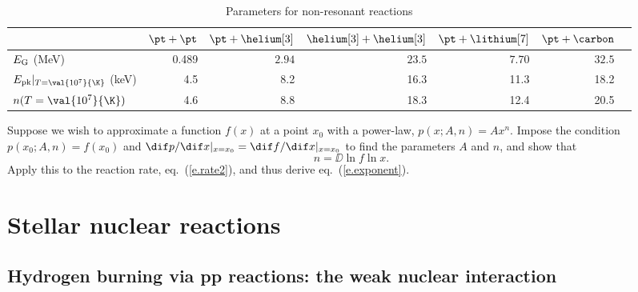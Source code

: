 \begin{table}[hb]
\caption{\label{t.reaction} Parameters for non-resonant reactions}
\begin{tabular}{lrrrrrr}
 & $\pt+\pt$ & $\pt+\helium[3]$ & $\helium[3]+\helium[3]$ & $\pt+\lithium[7]$ & $\pt+\carbon$\\
\hline
$E_{\mathrm{G}}$ (MeV) & 0.489 & $2.94$ & $23.5$ & $7.70$ & $32.5$\\
$\Epk|_{T=\val{10^{7}}{\K}}$ (keV) & 4.5 & 8.2 & 16.3 & 11.3 & 18.2\\
$n(T = \val{10^{7}}{\K})$ & 4.6 & 8.8 & 18.3 & 12.4 & 20.5\\
\end{tabular}
\end{table}

\begin{exercisebox}
\label{ex.power-law}
Suppose we wish to approximate a function $f(x)$ at a point $x_{0}$ with a power-law, $p(x;A,n) = Ax^{n}$. Impose the condition $p(x_{0};A,n) = f(x_{0})$ and $\dif p/\dif x |_{x=x_{0}} = \dif f/\dif x|_{x=x_{0}}$ to find the parameters $A$ and $n$, and show that
\[
	n = \DD{\ln f}{\ln x}.
\]
Apply this to the reaction rate, eq.~(\ref{e.rate2}), and thus derive eq.~(\ref{e.exponent}).
\end{exercisebox}

\section{Stellar nuclear reactions}

\subsection{Hydrogen burning via pp reactions: the weak nuclear interaction}

